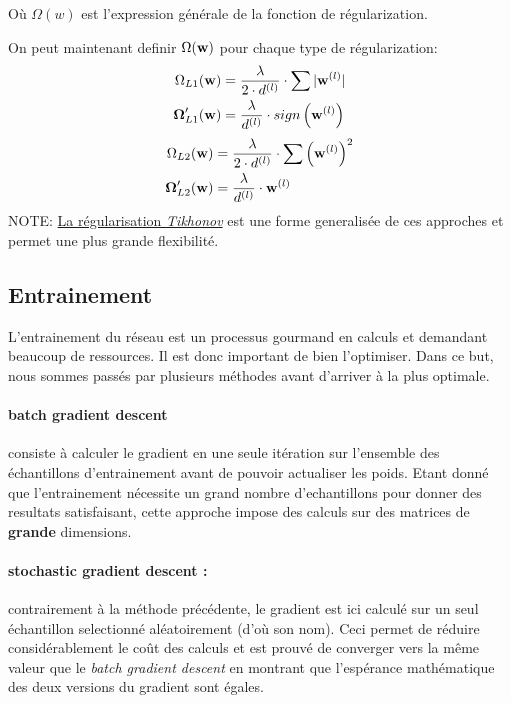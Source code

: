 \documentclass[11pt]{article}
\begin{document}
O\`u $\Omega(w)$ est l'expression g\'en\'erale de la fonction de r\'egularization.

On peut maintenant definir $\Omega({\bf w})$ pour chaque type de r\'egularization:
\begin{equation}
	\begin{aligned}
		\Omega_{L1} ({\bf w}) &= \frac{\lambda}{2\cdot d^{(l)}} \cdot \sum{|{\bf w}^{(l)}|}\\
		\boldsymbol\Omega_{L1}'({\bf w}) &= \frac{\lambda}{d^{(l)}} \cdot sign\left ({\bf w}^{(l)} \right)\\
	\end{aligned}
\end{equation}
\begin{equation}
	\begin{aligned}
		\Omega_{L2} ({\bf w}) &= \frac{\lambda}{2\cdot d^{(l)}} \cdot \sum{\left({\bf w}^{(l)}\right) ^2}\\
		\boldsymbol\Omega_{L2}'({\bf w}) &= \frac{\lambda}{d^{(l)}} \cdot {\bf w}^{(l)}\\
	\end{aligned}
\end{equation}
NOTE: \href{http://work.caltech.edu/slides/slides12.pdf}{La r\'egularisation
\emph{Tikhonov}} est une forme generalis\'ee de ces approches et permet une
plus grande flexibilit\'e.

\newpage
\subsection{Entrainement}
L'entrainement du r\'eseau est un processus gourmand en calculs et demandant
beaucoup de ressources. Il est donc important de bien l'optimiser. Dans ce but,
nous sommes pass\'es par plusieurs m\'ethodes avant d'arriver \`a la plus optimale.

\paragraph{batch gradient descent} consiste \`a calculer le gradient en une seule
it\'eration sur l'ensemble des \'echantillons d'entrainement avant de pouvoir
actualiser les poids. Etant donn\'e que l'entrainement n\'ecessite un grand
nombre d'echantillons pour donner des resultats satisfaisant, cette approche
impose des calculs sur des matrices de {\bf grande} dimensions.

\paragraph{stochastic gradient descent : } contrairement \`a la m\'ethode
pr\'ec\'edente, le gradient est ici calcul\'e sur un seul \'echantillon selectionn\'e
al\'eatoirement (d'o\`u son nom). Ceci permet de r\'eduire consid\'erablement le
co\^ut des calculs et est prouv\'e de converger vers la m\^eme valeur que le
{\em batch gradient descent} en montrant que l'esp\'erance math\'ematique des deux
versions du gradient sont \'egales.
\end{document}
